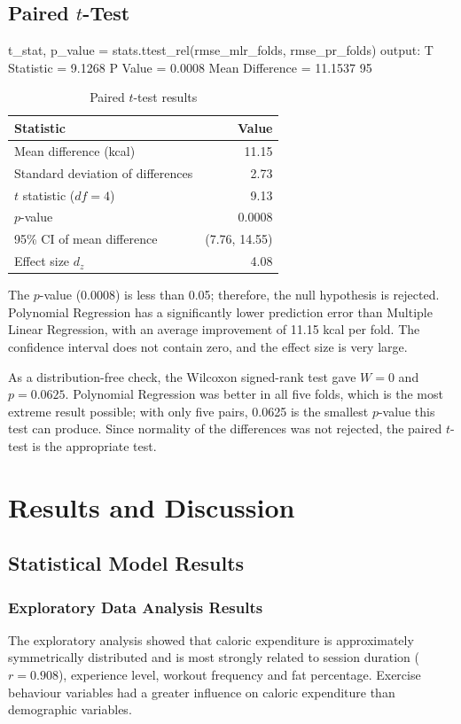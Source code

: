 \documentclass[12pt,a4paper]{report}
\begin{document}
\section{Paired $t$-Test}
\begin{code}
t_stat, p_value = stats.ttest_rel(rmse_mlr_folds, rmse_pr_folds)
output:
    T Statistic = 9.1268   P Value = 0.0008
    Mean Difference = 11.1537   95%
\end{code}
\begin{table}[H]
\centering
\begin{tabular}{lr}
\toprule
\textbf{Statistic} & \textbf{Value}\\
\midrule
Mean difference (kcal) & 11.15\\
Standard deviation of differences & 2.73\\
$t$ statistic ($df = 4$) & 9.13\\
$p$-value & 0.0008\\
95\% CI of mean difference & (7.76, 14.55)\\
Effect size $d_z$ & 4.08\\
\bottomrule
\end{tabular}
\caption{Paired $t$-test results}
\end{table}
The $p$-value (0.0008) is less than 0.05; therefore, the null hypothesis is rejected. Polynomial Regression has a significantly lower prediction error than Multiple Linear Regression, with an average improvement of 11.15 kcal per fold. The confidence interval does not contain zero, and the effect size is very large.

As a distribution-free check, the Wilcoxon signed-rank test gave $W = 0$ and $p = 0.0625$. Polynomial Regression was better in all five folds, which is the most extreme result possible; with only five pairs, 0.0625 is the smallest $p$-value this test can produce. Since normality of the differences was not rejected, the paired $t$-test is the appropriate test.

\chapter{Results and Discussion}
\section{Statistical Model Results}
\subsection{Exploratory Data Analysis Results}
The exploratory analysis showed that caloric expenditure is approximately symmetrically distributed and is most strongly related to session duration ($r = 0.908$), experience level, workout frequency and fat percentage. Exercise behaviour variables had a greater influence on caloric expenditure than demographic variables.
\end{document}
